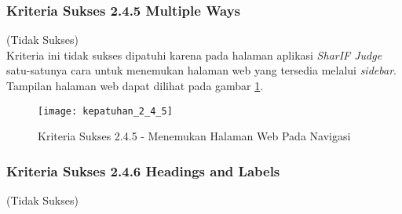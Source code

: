 \subsubsection{Kriteria Sukses 2.4.5 Multiple Ways}
\label{subsubsec:kepatuhan_kriteria_2.4.5}
(Tidak Sukses) \\

Kriteria ini tidak sukses dipatuhi karena pada halaman aplikasi \textit{SharIF Judge} satu-satunya cara untuk menemukan halaman web yang tersedia melalui \textit{sidebar}. Tampilan halaman web dapat dilihat pada gambar \ref{fig:kepatuhan_2_4_5}.
\begin{figure}[H]
	\centering  
	\texttt{[image: kepatuhan\_2\_4\_5]}  
	\caption[Kriteria Sukses 2.4.5 - Menemukan Halaman Web Pada Navigasi]{Kriteria Sukses 2.4.5 - Menemukan Halaman Web Pada Navigasi} 
	\label{fig:kepatuhan_2_4_5} 
\end{figure}

\subsubsection{Kriteria Sukses 2.4.6 Headings and Labels}
\label{subsubsec:kepatuhan_kriteria_2.4.6}
(Tidak Sukses) \\

